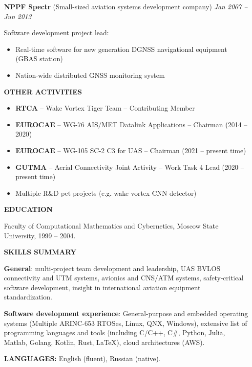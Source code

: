 \documentclass[a4paper]{article}
\begin{document}
    \textbf{NPPF Spectr} (Small-sized aviation systems development company) \hfill \textit{Jan 2007 -- Jun 2013}
    \vspace{1mm}
    
    Software development project lead:
	\begin{itemize}
		\setlength{\itemindent}{.5cm}
	    \item Real-time software for new generation DGNSS navigational equipment (GBAS station)
	    \item Nation-wide distributed GNSS monitoring system
    \end{itemize}
    \vspace{2mm}
    
    \textbf{OTHER ACTIVITIES}

	\begin{itemize}
	    \setlength{\itemindent}{.5cm}	
	    \item \textbf{RTCA} -- Wake Vortex Tiger Team -- Contributing Member
	    \item \textbf{EUROCAE} -- WG-76 AIS/MET Datalink Applications -- Chairman (2014 -- 2020)
	    \item \textbf{EUROCAE} -- WG-105 SC-2 C3 for UAS -- Chairman (2021 -- present time)
	    \item \textbf{GUTMA} -- Aerial Connectivity Joint Activity -- Work Task 4 Lead (2020 -- present time)
	    \item Multiple R\&D pet projects (e.g. wake vortex CNN detector)
    \end{itemize}
    \vspace{3mm}
    
    \textbf{EDUCATION}
    \vspace{2mm}
    
    Faculty of Computational Mathematics and Cybernetics, Moscow State University, 1999 -- 2004.
    \vspace{4mm}
    
    \textbf{SKILLS SUMMARY}
    \vspace{2mm}
    
    \textbf{General}: multi-project team development and leadership, UAS BVLOS connectivity and UTM systems, avionics and CNS/ATM systems, safety-critical software development, insight in international aviation equipment standardization.
    \vspace{2mm}
    
    \textbf{Software development experience}: General-purpose and embedded operating systems (Multiple ARINC-653 RTOSes, Linux, QNX, Windows), extensive list of programming languages and tools (including C/C++, C\#, Python, Julia, Matlab, Golang, Kotlin, Rust, LaTeX), cloud architectures (AWS).
    \vspace{4mm}
    
    \textbf{LANGUAGES:} English (fluent), Russian (native).
\end{document}
